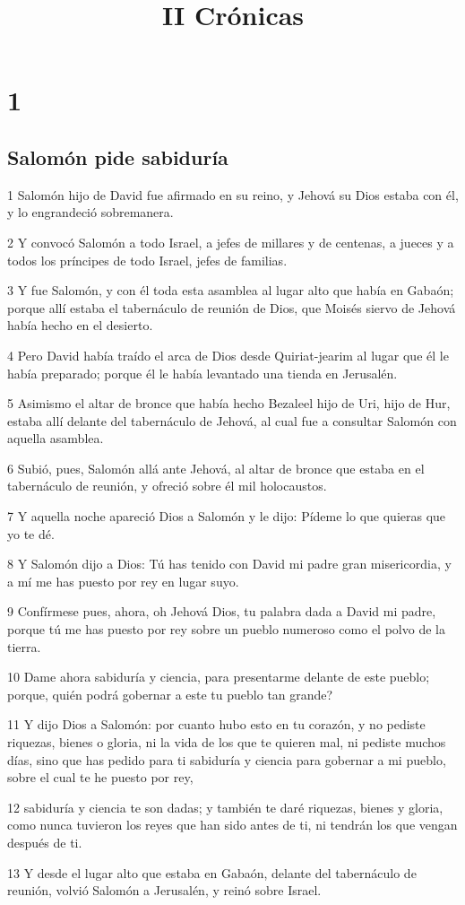 

\title{II Crónicas}

\chapter{1}

\section*{Salomón pide sabiduría}

\par 1 Salomón hijo de David fue afirmado en su reino, y Jehová su Dios estaba con él, y lo engrandeció sobremanera.
\par 2 Y convocó Salomón a todo Israel, a jefes de millares y de centenas, a jueces y a todos los príncipes de todo Israel, jefes de familias.
\par 3  Y fue Salomón, y con él toda esta asamblea al lugar alto que había en Gabaón; porque allí estaba el tabernáculo de reunión de Dios, que Moisés siervo de Jehová había hecho en el desierto.
\par 4 Pero David había traído el arca de Dios desde Quiriat-jearim al lugar que él le había preparado;  porque él le había levantado una tienda en Jerusalén. 
\par  5 Asimismo el altar de bronce que había hecho Bezaleel hijo de Uri, hijo de Hur, estaba allí delante del tabernáculo de Jehová, al cual fue a consultar Salomón con aquella asamblea. 
\par 6 Subió, pues, Salomón allá ante Jehová, al altar de bronce que estaba en el tabernáculo de reunión, y ofreció sobre él mil holocaustos.
\par 7 Y aquella noche apareció Dios  a Salomón y le dijo: Pídeme lo que quieras que yo te dé.
\par 8 Y Salomón dijo a Dios: Tú has tenido con David mi padre gran misericordia, y a mí me has puesto por rey en  lugar suyo.
\par 9 Confírmese pues, ahora, oh Jehová Dios,  tu palabra dada a David mi padre, porque tú me has puesto por rey sobre un pueblo numeroso como el polvo de la tierra. 
\par 10 Dame ahora sabiduría y ciencia, para presentarme delante de este pueblo; porque, quién podrá gobernar a este tu pueblo tan grande?
\par 11 Y dijo Dios a Salomón: por cuanto hubo esto en tu corazón, y no pediste riquezas, bienes o gloria, ni la vida de los que te quieren mal, ni pediste muchos días, sino que has pedido para ti sabiduría y ciencia para gobernar a mi pueblo, sobre el cual te he puesto por rey,
\par 12 sabiduría y ciencia te son dadas; y también te daré riquezas, bienes y gloria, como nunca tuvieron los reyes que han sido antes de ti, ni tendrán los que vengan después de ti.
\par 13 Y desde el lugar alto que estaba en Gabaón, delante del tabernáculo de reunión, volvió Salomón a Jerusalén, y reinó sobre Israel.

